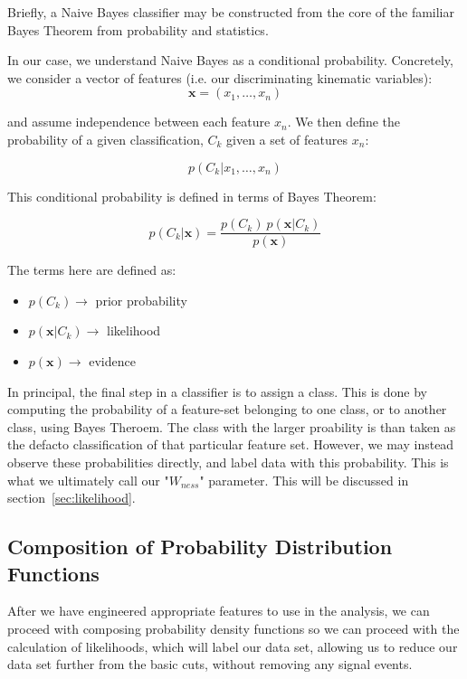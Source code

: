 Briefly, a Naive Bayes classifier may be constructed from the core of the
familiar Bayes Theorem from probability and statistics.

In our case, we understand Naive Bayes as a conditional probability. Concretely,
we consider a vector of features (i.e. our discriminating kinematic variables):
\begin{equation}
	\label{eq:feature_vector}
\mathbf{x} = (x_1, \dots, x_n)
\end{equation}

and assume independence between each feature $x_n$. We then define the
probability of a given classification, $C_k$ given a set of features $x_n$:

\begin{equation}
	\label{eq:cond_probabilty}
p(C_k \vert x_1, \dots, x_n)
\end{equation}

This conditional probability is defined in terms of Bayes Theorem:

\begin{equation}
	\label{eq:bayes_theorm}
p(C_k \vert \mathbf{x}) = \frac{p(C_k) \ p(\mathbf{x} \vert C_k)}{p(\mathbf{x})}
\end{equation}

The terms here are defined as:
\begin{itemize}
	\item $p(C_k)\rightarrow$ prior probability
	\item $p(\mathbf{x} \vert C_k)\rightarrow$ likelihood
	\item $p(\mathbf{x})\rightarrow$ evidence
\end{itemize}

In principal, the final step in a classifier is to assign a class. This is done
by computing the probability of a feature-set belonging to one class, or to
another class, using Bayes Theroem. The class with the larger proability is than
taken as the defacto classification of that particular feature set. However, we
may instead observe these probabilities directly, and label data with this
probability. This is what we ultimately call our "$W_{ness}$" parameter. This
will be discussed in section~\ref{sec:likelihood}.

\subsection{Composition of Probability Distribution Functions}
After we have engineered appropriate features to use in the analysis, we can
proceed with composing probability density functions so we can proceed with the
calculation of likelihoods, which will label our data set, allowing us to reduce
our data set further from the basic cuts, without removing any signal events.


